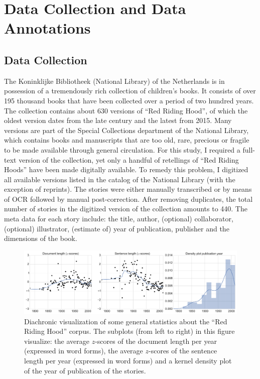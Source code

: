 \section{Data Collection and Data Annotations}

\subsection{Data Collection}\label{sec:data}
The Koninklijke Bibliotheek (National Library) of the Netherlands is in possession of a tremendously rich collection of children's books. It consists of over 195 thousand books that have been collected over a period of two hundred years. The collection contains about 630 versions of ``Red Riding Hood'', of which the oldest version dates from the late  century and the latest from 2015. Many versions are part of the Special Collections department of the National Library, which contains books and manuscripts that are too old, rare, precious or fragile to be made available through general circulation. For this study, I required a full-text version of the collection, yet only a handful of retellings of ``Red Riding Hoods'' have been made digitally available. To remedy this problem, I digitized all available versions listed in the catalog of the National Library (with the exception of reprints). The stories were either manually transcribed or by means of OCR followed by manual post-correction. After removing duplicates, the total number of stories in the digitized version of the collection amounts to 440\autocite[][See \texttt{http://fbkarsdorp.github.io/rrh-browser} for a bibliography of all stories as well as an interactive search engine of the collection.]{folgert_karsdorp_2016_51588}. The meta data for each story include: the title, author, (optional) collaborator, (optional) illustrator, (estimate of) year of publication, publisher and the dimensions of the book.

\begin{figure}
\includegraphics[width=\textwidth]{images/statistics}
\caption{Diachronic visualization of some general statistics about the ``Red Riding Hood'' corpus. The subplots (from left to right) in this figure visualize: the average $z$-scores of the document length per year (expressed in word forms), the average $z$-scores of the sentence length per year (expressed in word forms) and a kernel density plot of the year of publication of the stories.}
\label{fig:corpus-statistics}
\end{figure}

